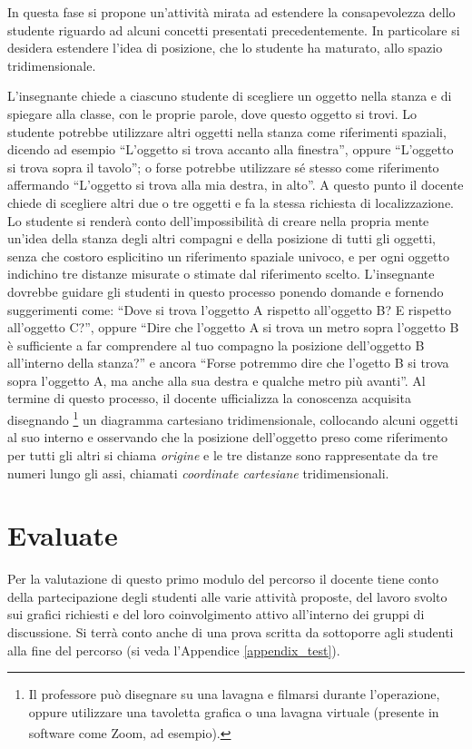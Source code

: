 \documentclass{report} \usepackage[T1]{fontenc} \usepackage[italian]{babel}
\begin{document}
In questa fase si propone un'attività mirata ad estendere la consapevolezza
dello studente riguardo ad alcuni concetti presentati precedentemente.
In particolare si desidera estendere l'idea di posizione, che lo studente ha maturato,
allo spazio tridimensionale.

L'insegnante chiede a ciascuno studente di scegliere un oggetto nella stanza e di
spiegare alla classe, con le proprie parole, dove questo oggetto si trovi.
Lo studente potrebbe utilizzare altri oggetti nella stanza come riferimenti spaziali,
dicendo ad esempio ``L'oggetto si trova accanto alla finestra'', oppure
``L'oggetto si trova sopra il tavolo''; o forse potrebbe utilizzare sé stesso come
riferimento affermando ``L'oggetto si trova alla mia destra, in alto''.
A questo punto il docente chiede di scegliere altri due o tre oggetti
e fa la stessa richiesta di localizzazione. Lo studente si renderà
conto dell'impossibilità di creare nella propria mente un'idea della stanza
degli altri compagni e della posizione di tutti gli oggetti, senza che
costoro esplicitino un riferimento spaziale univoco, e per ogni oggetto indichino tre distanze
misurate o stimate dal riferimento scelto.
L'insegnante dovrebbe guidare gli studenti in questo processo ponendo domande e fornendo suggerimenti
come: ``Dove si trova l'oggetto A rispetto all'oggetto B? E rispetto all'oggetto C?'',
oppure ``Dire che l'oggetto A si trova un metro sopra l'oggetto B è sufficiente
a far comprendere al tuo compagno la posizione dell'oggetto B all'interno della stanza?''
e ancora ``Forse potremmo dire che l'ogetto B si trova sopra l'oggetto A, ma anche alla sua destra
e qualche metro più avanti''.
Al termine di questo processo, il docente ufficializza la conoscenza acquisita disegnando
\footnote{
Il professore può disegnare su una lavagna e filmarsi durante l'operazione, oppure
utilizzare una tavoletta grafica o una lavagna virtuale (presente in software
come Zoom\textsuperscript{\textregistered}, ad esempio).
}
un diagramma cartesiano tridimensionale, collocando alcuni oggetti al suo interno
e osservando che la posizione dell'oggetto preso come riferimento per tutti gli altri
si chiama \emph{origine} e le tre distanze sono rappresentate da tre numeri lungo
gli assi, chiamati \emph{coordinate cartesiane} tridimensionali.

\section{Evaluate}
Per la valutazione di questo primo modulo del percorso il docente tiene conto della
partecipazione degli studenti alle varie attività proposte, del lavoro svolto sui
grafici richiesti e del loro coinvolgimento attivo all’interno dei gruppi di discussione.
Si terrà conto anche di una prova scritta da sottoporre agli
studenti alla fine del percorso
(si veda l'Appendice \ref{appendix_test}).
\end{document}
